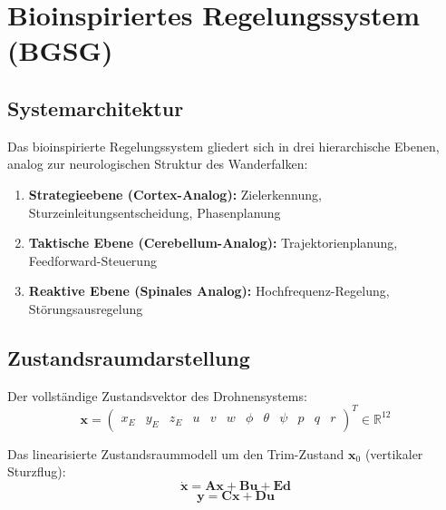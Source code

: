 ﻿\documentclass[12pt,a4paper]{article}
\theoremstyle{remark}
\begin{document}
	\section{Bioinspiriertes Regelungssystem (BGSG)}
	\label{sec:regler}
	
	\subsection{Systemarchitektur}
	
	Das bioinspirierte Regelungssystem gliedert sich in drei hierarchische Ebenen, analog zur neurologischen Struktur des Wanderfalken:
	
	\begin{enumerate}
		\item \textbf{Strategieebene (Cortex-Analog):} Zielerkennung, Sturzeinleitungsentscheidung, Phasenplanung
		\item \textbf{Taktische Ebene (Cerebellum-Analog):} Trajektorienplanung, Feedforward-Steuerung
		\item \textbf{Reaktive Ebene (Spinales Analog):} Hochfrequenz-Regelung, Störungsausregelung
	\end{enumerate}
	
	\subsection{Zustandsraumdarstellung}
	
	Der vollständige Zustandsvektor des Drohnensystems:
	\begin{equation}
		\mathbf{x} = \begin{pmatrix} x_E & y_E & z_E & u & v & w & \phi & \theta & \psi & p & q & r \end{pmatrix}^T \in \mathbb{R}^{12}
	\end{equation}
	
	Das linearisierte Zustandsraummodell um den Trim-Zustand $\mathbf{x}_0$ (vertikaler Sturzflug):
	\begin{equation}
		\dot{\mathbf{x}} = \mathbf{A}\mathbf{x} + \mathbf{B}\mathbf{u} + \mathbf{E}\mathbf{d}
		\label{eq:ss}
	\end{equation}
	\begin{equation}
		\mathbf{y} = \mathbf{C}\mathbf{x} + \mathbf{D}\mathbf{u}
	\end{equation}
	
\end{document}
